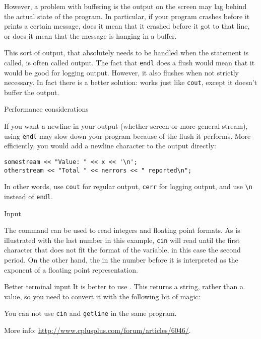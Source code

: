 However, a problem with buffering is the output on the screen may lag
behind the actual state of the program. In particular, if your program
crashes before it prints a certain message, does it mean that it
crashed before it got to that line, or does it mean that the message
is hanging in a buffer.

This sort of output, that absolutely needs to be handled when the
statement is called, is often called  output.
The fact that \lstinline{endl} does a flush would mean that it would be good
for logging output. However, it also flushes when not strictly
necessary. In fact there is a better solution:
 works just like \lstinline{cout}, except it
doesn't buffer the output.

 {Performance considerations}

If you want a newline in your output (whether screen or more general stream),
using \lstinline+endl+ may slow down your program because of the flush
it performs.
More efficiently, you would add a newline character to the output directly:
\begin{lstlisting}
somestream << "Value: " << x << '\n';
otherstream << "Total " << nerrors << " reported\n";
\end{lstlisting}
In other words, use \lstinline{cout} for regular output, \lstinline{cerr} for logging
output, and use \verb+\n+ instead of \lstinline{endl}.

 {Input}
\label{sec:termin}

The  command can be used to read integers
and floating point formats.
%
%
As is illustrated with the last number in this example,
\lstinline{cin} will read until the first character that does not
fit the format of the variable, in this case the second period.
On the other hand, the  in the number before it is 
interpreted as the exponent of a floating point representation.

\begin{block}{Better terminal input}
  \label{sl:getline}
  It is better to use . This returns a string,
  rather than a value, so you need to convert it with the following bit
  of magic:

  You can not use \lstinline{cin} and \lstinline{getline} in the same program.

  More info:
  \url{http://www.cplusplus.com/forum/articles/6046/}.

\end{block}

